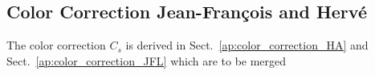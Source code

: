%
%

\subsection{Color Correction {\color{blue} Jean-Fran\c cois and Herv\'e}}

The color correction $C_{s}$ is derived in Sect.~\ref{ap:color_correction_HA} and
Sect.~\ref{ap:color_correction_JFL} {\color{magenta} which are to be merged} 


